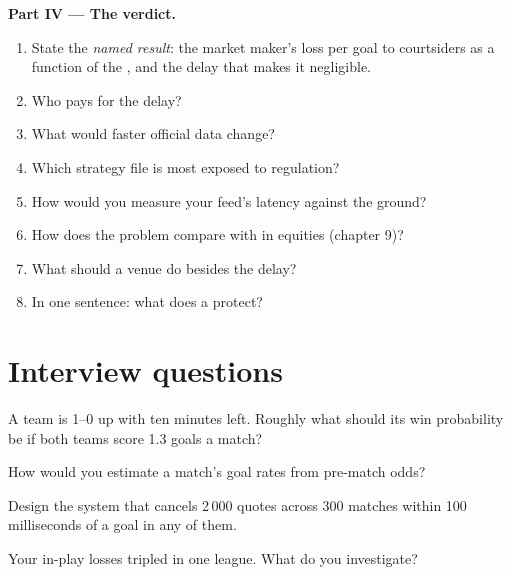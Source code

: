 \begin{problem}
\medskip\noindent\textbf{Part IV --- The verdict.}
\begin{enumerate}[resume]
\item State the \emph{named result}: the market maker's loss per goal to courtsiders as a function of the , and the delay that makes it
negligible.
\item Who pays for the delay?
\item What would faster official data change?
\item Which strategy file is most exposed to regulation?
\item How would you measure your feed's latency against the ground?
\item How does the problem compare with  in equities (chapter 9)?
\item What should a venue do besides the delay?
\item In one sentence: what does a  protect?
\end{enumerate}
\end{problem}

\section{Interview questions}

\begin{interviewq}\label{iq:hf:prediction-and-sports-market-making:1}
A team is 1--0 up with ten minutes left. Roughly what should its win probability be if both teams score 1.3 goals a match?
\end{interviewq}

\begin{interviewq}\label{iq:hf:prediction-and-sports-market-making:2}
How would you estimate a match's goal rates from pre-match odds?
\end{interviewq}

\begin{interviewq}\label{iq:hf:prediction-and-sports-market-making:3}
Design the system that cancels 2\,000 quotes across 300 matches within 100 milliseconds of a goal in any of them.
\end{interviewq}

\begin{interviewq}\label{iq:hf:prediction-and-sports-market-making:4}
Your in-play losses tripled in one league. What do you investigate?
\end{interviewq}

